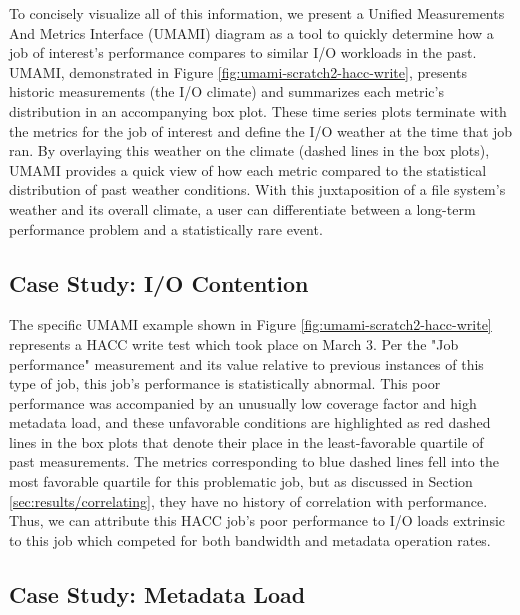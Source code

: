 To concisely visualize all of this information, we present a Unified Measurements And Metrics Interface (UMAMI) diagram as a tool to quickly determine how a job of interest's performance compares to similar I/O workloads in the past.
UMAMI, demonstrated in Figure \ref{fig:umami-scratch2-hacc-write}, presents historic measurements (the I/O climate) and summarizes each metric's distribution in an accompanying box plot.
These time series plots terminate with the metrics for the job of interest and define the I/O weather at the time that job ran.
By overlaying this weather on the climate (dashed lines in the box plots), UMAMI provides a quick view of how each metric compared to the statistical distribution of past weather conditions.
With this juxtaposition of a file system's weather and its overall climate, a user can differentiate between a long-term performance problem and a statistically rare event.%


\subsection{Case Study: I/O Contention}

The specific UMAMI example shown in Figure \ref{fig:umami-scratch2-hacc-write} represents a HACC write test which took place on March 3.
Per the "Job performance" measurement and its value relative to previous instances of this type of job, this job's performance is statistically abnormal.
This poor performance was accompanied by an unusually low coverage factor and high metadata load, and these unfavorable conditions are highlighted as red dashed lines in the box plots that denote their place in the least-favorable quartile of past measurements.
The metrics corresponding to blue dashed lines fell into the most favorable quartile for this problematic job, but as discussed in Section \ref{sec:results/correlating}, they have no history of correlation with performance.
Thus, we can attribute this HACC job's poor performance to I/O loads extrinsic to this job which competed for both bandwidth and metadata operation rates.

\subsection{Case Study: Metadata Load}

